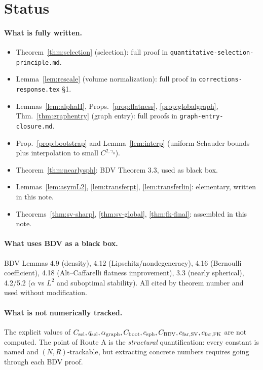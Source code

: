 \documentclass[11pt]{article}
\theoremstyle{definition}
\begin{document}
\section{Status}

\paragraph{What is fully written.}
\begin{itemize}
\item Theorem~\ref{thm:selection} (selection): full proof in
\texttt{quantitative-selection-principle.md}.
\item Lemma~\ref{lem:rescale} (volume normalization): full proof in
\texttt{corrections-response.tex} \S 1.
\item Lemmas~\ref{lem:alphaH}, Props.~\ref{prop:flatness},
\ref{prop:globalgraph}, Thm.~\ref{thm:graphentry} (graph entry):
full proofs in \texttt{graph-entry-closure.md}.
\item Prop.~\ref{prop:bootstrap} and Lemma~\ref{lem:interp} (uniform
Schauder bounds plus interpolation to small $C^{2,\gamma_0}$).
\item Theorem~\ref{thm:nearlysph}: BDV Theorem 3.3, used as black box.
\item Lemmas~\ref{lem:asymL2}, \ref{lem:transferpt}, \ref{lem:transferlin}:
elementary, written in this note.
\item Theorems~\ref{thm:sv-sharp}, \ref{thm:sv-global}, \ref{thm:fk-final}:
assembled in this note.
\end{itemize}

\paragraph{What uses BDV as a black box.}
BDV Lemmas 4.9 (density), 4.12 (Lipschitz/nondegeneracy), 4.16 (Bernoulli
coefficient), 4.18 (Alt--Caffarelli flatness improvement), 3.3 (nearly
spherical), 4.2/5.2 ($\alpha$ vs $L^2$ and suboptimal stability). All cited by theorem number and used
without modification.

\paragraph{What is not numerically tracked.}
The explicit values of $C_{\rm sel}, q_{\rm sel}, \alpha_{\rm graph},
C_{\rm boot}, c_{\rm sph}, C_{\rm BDV}, c_{\rm far,SV}, c_{\rm far,FK}$
are not computed. The point of Route A is the \emph{structural}
quantification: every constant is named and $(N,R)$-trackable, but
extracting concrete numbers requires going through each BDV proof.
\end{document}
